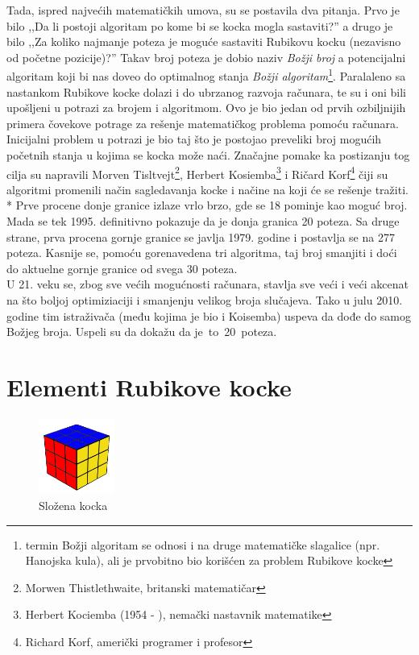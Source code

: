 \documentclass[a4paper]{article}
\begin{document}
Tada, ispred najvećih matematičkih umova, su se postavila dva pitanja. Prvo je bilo ,,Da li postoji algoritam po kome bi se kocka mogla sastaviti?'' a drugo je bilo ,,Za koliko najmanje poteza je moguće sastaviti Rubikovu kocku (nezavisno od početne pozicije)?'' Takav broj poteza je dobio naziv \textit{Božji broj} a potencijalni algoritam koji bi nas doveo do optimalnog stanja \textit{Božji algoritam}\footnote{termin Božji algoritam se odnosi i na druge matematičke slagalice (npr. Hanojska kula), ali je prvobitno bio korišćen za problem Rubikove kocke}. Paralaleno sa nastankom Rubikove kocke dolazi i do ubrzanog razvoja računara, te su i oni bili upošljeni u potrazi za brojem i algoritmom. Ovo je bio jedan od prvih ozbiljnijih primera čovekove potrage za rešenje matematičkog problema pomoću računara. \\

Inicijalni problem u potrazi je bio taj što je postojao preveliki broj mogućih početnih stanja u kojima se kocka može naći. Značajne pomake ka postizanju tog cilja su napravili Morven Tisltvejt\footnote{{Morwen Thistlethwaite}, britanski matematičar}, Herbert Kosiemba\footnote{{Herbert Kociemba} (1954 - ), nemački nastavnik matematike} i Ričard Korf\footnote{{Richard Korf}, američki programer i profesor} čiji su algoritmi promenili način sagledavanja kocke i načine na koji će se rešenje tražiti.\\*
Prve procene donje granice izlaze vrlo brzo, gde se 18 pominje kao moguć broj. Mada se tek 1995. definitivno pokazuje da je donja granica 20 poteza. Sa druge strane, prva procena gornje granice se javlja 1979. godine i postavlja se na 277 poteza. Kasnije se, pomoću gorenavedena tri algoritma, taj broj smanjiti i doći do aktuelne gornje granice od svega 30 poteza.  \\

U 21. veku se, zbog sve većih mogućnosti računara, stavlja sve veći i veći akcenat na što boljoj optimiziaciji i smanjenju velikog broja slučajeva. Tako u julu 2010. godine tim istraživača (među kojima je bio i Koisemba) uspeva da dođe do samog Božjeg broja. Uspeli su da dokažu da je to 20 poteza.

\section{Elementi Rubikove kocke}
\label{sec:elementi}


 \begin{figure}[h!]
        \centering\includegraphics[height=2.5cm]{images/slozena-kocka.png} 
        \caption{Složena kocka}
        \label{fig:slozenakocka}
\end{figure}
\end{document}
